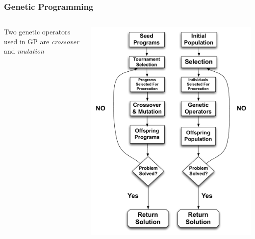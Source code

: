 \documentclass{beamer}
\begin{document}
\begin{frame}
\end{frame}

\begin{frame}
	\frametitle{Genetic Programming}

\begin{columns}[C]
\begin{column}{0.5\textwidth}


Two genetic operators used in GP are \textit{crossover} and \textit{mutation}


\end{column}
\begin{column}{0.5\textwidth}
   \includegraphics[height=0.85\textheight]{Illustrations/GP3.pdf}
       \\
\end{column}
\end{columns}

\end{frame}
\end{document}
